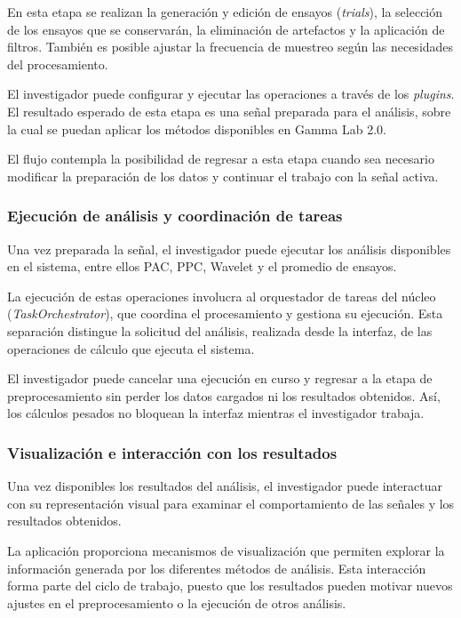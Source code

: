 \documentclass[11pt,a4paper]{article}
\DeclareRobustCommand{\_}{\textunderscore\allowbreak}
\begin{document}
En esta etapa se realizan la generación y edición de ensayos (\textit{trials}), la selección de los ensayos que se conservarán, la eliminación de artefactos y la aplicación de filtros. También es posible ajustar la frecuencia de muestreo según las necesidades del procesamiento.

El investigador puede configurar y ejecutar las operaciones a través de los \textit{plugins}. El resultado esperado de esta etapa es una señal preparada para el análisis, sobre la cual se puedan aplicar los métodos disponibles en Gamma Lab 2.0.

El flujo contempla la posibilidad de regresar a esta etapa cuando sea necesario modificar la preparación de los datos y continuar el trabajo con la señal activa.

\subsubsection{Ejecución de análisis y coordinación de tareas}
Una vez preparada la señal, el investigador puede ejecutar los análisis disponibles en el sistema, entre ellos PAC, PPC, Wavelet y el promedio de ensayos.

La ejecución de estas operaciones involucra al orquestador de tareas del núcleo (\textit{TaskOrchestrator}), que coordina el procesamiento y gestiona su ejecución. Esta separación distingue la solicitud del análisis, realizada desde la interfaz, de las operaciones de cálculo que ejecuta el sistema.

El investigador puede cancelar una ejecución en curso y regresar a la etapa de preprocesamiento sin perder los datos cargados ni los resultados obtenidos.
Así, los cálculos pesados no bloquean la interfaz mientras el investigador trabaja.

\subsubsection{Visualización e interacción con los resultados}
Una vez disponibles los resultados del análisis, el investigador puede interactuar con su representación visual para examinar el comportamiento de las señales y los resultados obtenidos.

La aplicación proporciona mecanismos de visualización que permiten explorar la información generada por los diferentes métodos de análisis. Esta interacción forma parte del ciclo de trabajo, puesto que los resultados pueden motivar nuevos ajustes en el preprocesamiento o la ejecución de otros análisis.
\end{document}
